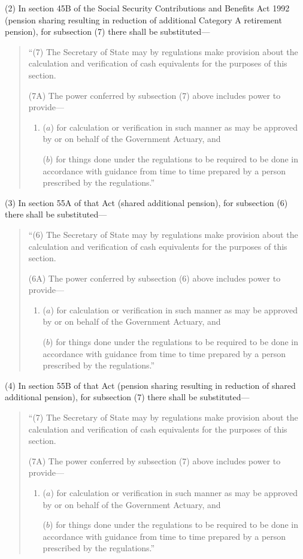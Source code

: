 \documentclass[12pt,a4paper]{article}
\begin{document}
(2) In section 45B of the Social Security Contributions and Benefits Act 1992 (pension sharing resulting in reduction of additional Category A retirement pension), for subsection (7)  there shall be substituted—
\begin{quotation}
“(7) The Secretary of State may by regulations make provision about the calculation and verification of cash equivalents for the purposes of this section.

(7A) The power conferred by subsection (7)  above includes power to provide—
\begin{enumerate}\item[]
($a$) for calculation or verification in such manner as may be approved by or on behalf of the Government Actuary, and

($b$) for things done under the regulations to be required to be done in accordance with guidance from time to time prepared by a person prescribed by the regulations.”
\end{enumerate}
\end{quotation}

(3) In section 55A of that Act (shared additional pension), for subsection (6)  there shall be substituted—
\begin{quotation}
“(6) The Secretary of State may by regulations make provision about the calculation and verification of cash equivalents for the purposes of this section.

(6A) The power conferred by subsection (6)  above includes power to provide—
\begin{enumerate}\item[]
($a$) for calculation or verification in such manner as may be approved by or on behalf of the Government Actuary, and

($b$) for things done under the regulations to be required to be done in accordance with guidance from time to time prepared by a person prescribed by the regulations.”
\end{enumerate}
\end{quotation}

(4) In section 55B of that Act (pension sharing resulting in reduction of shared additional pension), for subsection (7)  there shall be substituted—
\begin{quotation}
“(7) The Secretary of State may by regulations make provision about the calculation and verification of cash equivalents for the purposes of this section.

(7A) The power conferred by subsection (7)  above includes power to provide—
\begin{enumerate}\item[]
($a$) for calculation or verification in such manner as may be approved by or on behalf of the Government Actuary, and

($b$) for things done under the regulations to be required to be done in accordance with guidance from time to time prepared by a person prescribed by the regulations.”
\end{enumerate}
\end{quotation}
\end{document}
